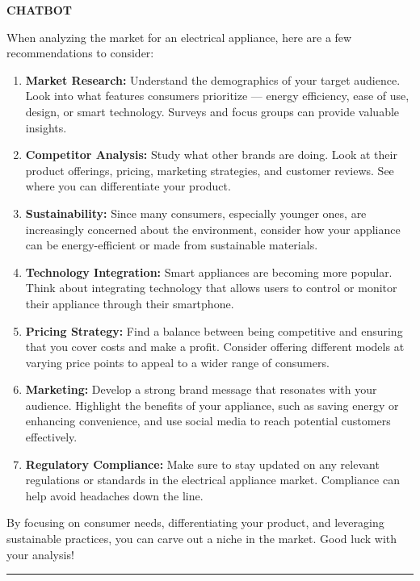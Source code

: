 \documentclass[
  11pt,
  oneside]{article}
\begin{document}
\textbf{CHATBOT}

When analyzing the market for an electrical appliance, here are a few
recommendations to consider:

\begin{enumerate}
\def\labelenumi{\arabic{enumi}.}
\item
  \textbf{Market Research:} Understand the demographics of your target
  audience. Look into what features consumers prioritize --- energy
  efficiency, ease of use, design, or smart technology. Surveys and
  focus groups can provide valuable insights.
\item
  \textbf{Competitor Analysis:} Study what other brands are doing. Look
  at their product offerings, pricing, marketing strategies, and
  customer reviews. See where you can differentiate your product.
\item
  \textbf{Sustainability:} Since many consumers, especially younger
  ones, are increasingly concerned about the environment, consider how
  your appliance can be energy-efficient or made from sustainable
  materials.
\item
  \textbf{Technology Integration:} Smart appliances are becoming more
  popular. Think about integrating technology that allows users to
  control or monitor their appliance through their smartphone.
\item
  \textbf{Pricing Strategy:} Find a balance between being competitive
  and ensuring that you cover costs and make a profit. Consider offering
  different models at varying price points to appeal to a wider range of
  consumers.
\item
  \textbf{Marketing:} Develop a strong brand message that resonates with
  your audience. Highlight the benefits of your appliance, such as
  saving energy or enhancing convenience, and use social media to reach
  potential customers effectively.
\item
  \textbf{Regulatory Compliance:} Make sure to stay updated on any
  relevant regulations or standards in the electrical appliance market.
  Compliance can help avoid headaches down the line.
\end{enumerate}

By focusing on consumer needs, differentiating your product, and
leveraging sustainable practices, you can carve out a niche in the
market. Good luck with your analysis!

\begin{center}\rule{0.5\linewidth}{0.5pt}\end{center}
\end{document}
